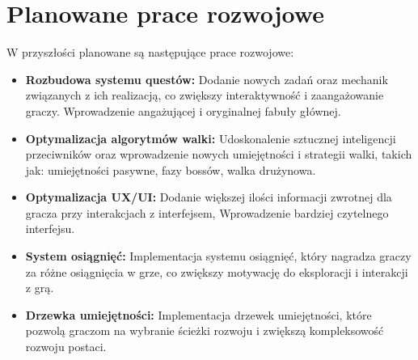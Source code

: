 \section{Planowane prace rozwojowe}

W przyszłości planowane są następujące prace rozwojowe:

\begin{itemize}
    \item \textbf{Rozbudowa systemu questów:} Dodanie nowych zadań oraz mechanik związanych z ich realizacją, co zwiększy interaktywność i zaangażowanie graczy. Wprowadzenie angażującej i oryginalnej fabuły głównej.
    \item \textbf{Optymalizacja algorytmów walki:} Udoskonalenie sztucznej inteligencji przeciwników oraz wprowadzenie nowych umiejętności i strategii walki, takich jak: umiejętności pasywne, fazy bossów, walka drużynowa.
    \item \textbf{Optymalizacja UX/UI:} Dodanie większej ilości informacji zwrotnej dla gracza przy interakcjach z interfejsem, Wprowadzenie bardziej czytelnego interfejsu.
    \item \textbf{System osiągnięć:} Implementacja systemu osiągnięć, który nagradza graczy za różne osiągnięcia w grze, co zwiększy motywację do eksploracji i interakcji z grą.
    \item \textbf{Drzewka umiejętności:} Implementacja drzewek umiejętności, które pozwolą graczom na wybranie ścieżki rozwoju i zwiększą kompleksowość rozwoju postaci.
\end{itemize}




